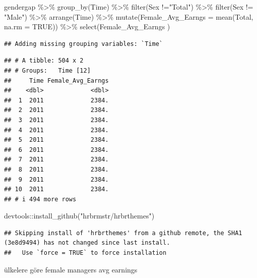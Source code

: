 \documentclass[
]{article}
\newenvironment{Shaded}{\begin{snugshade}}{\end{snugshade}}
\newcommand{\AttributeTok}[1]{\textcolor[rgb]{0.77,0.63,0.00}{#1}}
\newcommand{\ConstantTok}[1]{\textcolor[rgb]{0.00,0.00,0.00}{#1}}
\newcommand{\FunctionTok}[1]{\textcolor[rgb]{0.00,0.00,0.00}{#1}}
\newcommand{\NormalTok}[1]{#1}
\newcommand{\SpecialCharTok}[1]{\textcolor[rgb]{0.00,0.00,0.00}{#1}}
\newcommand{\StringTok}[1]{\textcolor[rgb]{0.31,0.60,0.02}{#1}}
\begin{document}
\begin{Shaded}
\begin{Highlighting}[]
\NormalTok{gendergap }\SpecialCharTok{\%\textgreater{}\%}
  \FunctionTok{group\_by}\NormalTok{(Time) }\SpecialCharTok{\%\textgreater{}\%}
  \FunctionTok{filter}\NormalTok{(Sex }\SpecialCharTok{!=}\StringTok{"Total"}\NormalTok{) }\SpecialCharTok{\%\textgreater{}\%}
  \FunctionTok{filter}\NormalTok{(Sex }\SpecialCharTok{!=} \StringTok{"Male"}\NormalTok{) }\SpecialCharTok{\%\textgreater{}\%}
  \FunctionTok{arrange}\NormalTok{(Time) }\SpecialCharTok{\%\textgreater{}\%}
  \FunctionTok{mutate}\NormalTok{(}\AttributeTok{Female\_Avg\_Earngs =} \FunctionTok{mean}\NormalTok{(Total, }\AttributeTok{na.rm =} \ConstantTok{TRUE}\NormalTok{)) }\SpecialCharTok{\%\textgreater{}\%}
  \FunctionTok{select}\NormalTok{(Female\_Avg\_Earngs )}
\end{Highlighting}
\end{Shaded}

\begin{verbatim}
## Adding missing grouping variables: `Time`
\end{verbatim}

\begin{verbatim}
## # A tibble: 504 x 2
## # Groups:   Time [12]
##     Time Female_Avg_Earngs
##    <dbl>             <dbl>
##  1  2011             2384.
##  2  2011             2384.
##  3  2011             2384.
##  4  2011             2384.
##  5  2011             2384.
##  6  2011             2384.
##  7  2011             2384.
##  8  2011             2384.
##  9  2011             2384.
## 10  2011             2384.
## # i 494 more rows
\end{verbatim}

\begin{Shaded}
\begin{Highlighting}[]
\NormalTok{devtools}\SpecialCharTok{::}\FunctionTok{install\_github}\NormalTok{(}\StringTok{"hrbrmstr/hrbrthemes"}\NormalTok{)}
\end{Highlighting}
\end{Shaded}

\begin{verbatim}
## Skipping install of 'hrbrthemes' from a github remote, the SHA1 (3e8d9494) has not changed since last install.
##   Use `force = TRUE` to force installation
\end{verbatim}

ülkelere göre female managers avg earnings
\end{document}
